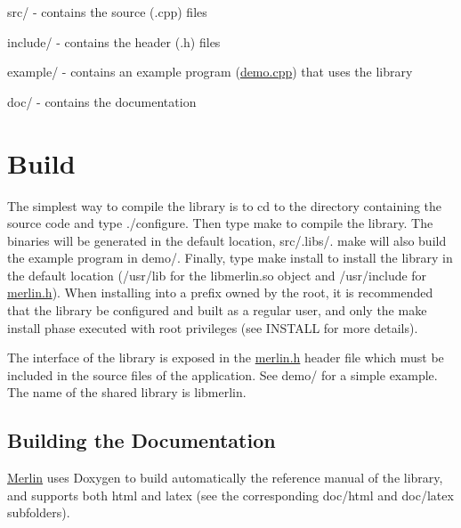\begin{DoxyItemize}
\item {\ttfamily src/} -\/ contains the source (.cpp) files
\item {\ttfamily include/} -\/ contains the header (.h) files
\item {\ttfamily example/} -\/ contains an example program (\hyperlink{demo_8cpp_source}{demo.\+cpp}) that uses the library
\item {\ttfamily doc/} -\/ contains the documentation
\end{DoxyItemize}

\section*{Build}

The simplest way to compile the library is to {\ttfamily cd} to the directory containing the source code and type {\ttfamily ./configure}. Then type {\ttfamily make} to compile the library. The binaries will be generated in the default location, {\ttfamily src/.libs/}. {\ttfamily make} will also build the example program in {\ttfamily demo/}. Finally, type {\ttfamily make install} to install the library in the default location ({\ttfamily /usr/lib} for the {\ttfamily libmerlin.\+so} object and {\ttfamily /usr/include} for {\ttfamily \hyperlink{merlin_8h_source}{merlin.\+h}}). When installing into a prefix owned by the root, it is recommended that the library be configured and built as a regular user, and only the {\ttfamily make install} phase executed with root privileges (see I\+N\+S\+T\+A\+L\+L for more details). 


The interface of the library is exposed in the {\ttfamily \hyperlink{merlin_8h_source}{merlin.\+h}} header file which must be included in the source files of the application. See demo/ for a simple example. The name of the shared library is {\ttfamily libmerlin}.

\subsection*{Building the Documentation}

\hyperlink{classMerlin}{Merlin} uses Doxygen to build automatically the reference manual of the library, and supports both {\ttfamily html} and {\ttfamily latex} (see the corresponding {\ttfamily doc/html} and {\ttfamily doc/latex} subfolders).

